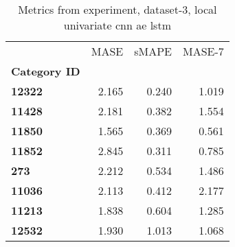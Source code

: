 \begin{table}[h]
\centering
\caption{Metrics from experiment, dataset-3, local univariate cnn ae lstm}
\label{table:local-univariate-cnn-ae-lstm-dataset-3}
\begin{tabular}{lrrr}
\toprule
{} &   MASE &  sMAPE &  MASE-7 \\
\textbf{Category ID} &        &        &         \\
\midrule
\textbf{12322      } &  2.165 &  0.240 &   1.019 \\
\textbf{11428      } &  2.181 &  0.382 &   1.554 \\
\textbf{11850      } &  1.565 &  0.369 &   0.561 \\
\textbf{11852      } &  2.845 &  0.311 &   0.785 \\
\textbf{273        } &  2.212 &  0.534 &   1.486 \\
\textbf{11036      } &  2.113 &  0.412 &   2.177 \\
\textbf{11213      } &  1.838 &  0.604 &   1.285 \\
\textbf{12532      } &  1.930 &  1.013 &   1.068 \\
\bottomrule
\end{tabular}
\end{table}
